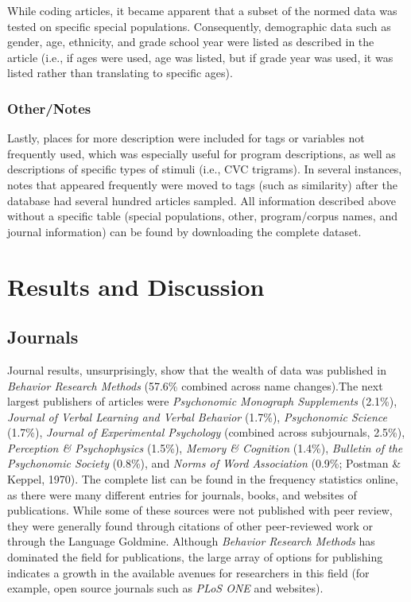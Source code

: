 \documentclass[english,,man]{apa6}
\theoremstyle{definition}
\theoremstyle{definition}
\theoremstyle{definition}
\theoremstyle{remark}
\begin{document}
While coding articles, it became apparent that a subset of the normed
data was tested on specific special populations. Consequently,
demographic data such as gender, age, ethnicity, and grade school year
were listed as described in the article (i.e., if ages were used, age
was listed, but if grade year was used, it was listed rather than
translating to specific ages).

\hypertarget{othernotes}{%
\subsubsection{Other/Notes}\label{othernotes}}

Lastly, places for more description were included for tags or variables
not frequently used, which was especially useful for program
descriptions, as well as descriptions of specific types of stimuli
(i.e., CVC trigrams). In several instances, notes that appeared
frequently were moved to tags (such as similarity) after the database
had several hundred articles sampled. All information described above
without a specific table (special populations, other, program/corpus
names, and journal information) can be found by downloading the complete
dataset.

\hypertarget{results-and-discussion}{%
\section{Results and Discussion}\label{results-and-discussion}}

\hypertarget{journals}{%
\subsection{Journals}\label{journals}}

Journal results, unsurprisingly, show that the wealth of data was
published in \emph{Behavior Research Methods} (57.6\% combined across
name changes).The next largest publishers of articles were
\emph{Psychonomic Monograph Supplements} (2.1\%), \emph{Journal of
Verbal Learning and Verbal Behavior} (1.7\%), \emph{Psychonomic Science}
(1.7\%), \emph{Journal of Experimental Psychology} (combined across
subjournals, 2.5\%), \emph{Perception \& Psychophysics} (1.5\%),
\emph{Memory \& Cognition} (1.4\%), \emph{Bulletin of the Psychonomic
Society} (0.8\%), and \emph{Norms of Word Association} (0.9\%; Postman
\& Keppel, 1970). The complete list can be found in the frequency
statistics online, as there were many different entries for journals,
books, and websites of publications. While some of these sources were
not published with peer review, they were generally found through
citations of other peer-reviewed work or through the Language Goldmine.
Although \emph{Behavior Research Methods} has dominated the field for
publications, the large array of options for publishing indicates a
growth in the available avenues for researchers in this field (for
example, open source journals such as \emph{PLoS ONE} and websites).
\end{document}
